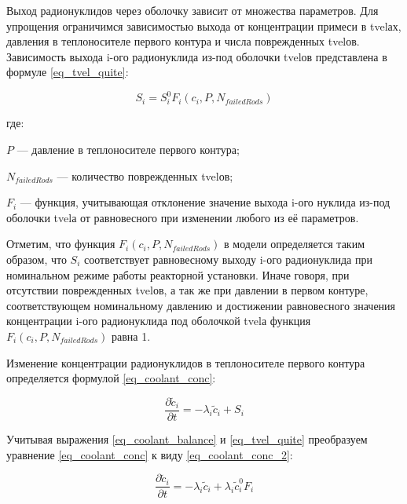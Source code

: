 Выход радионуклидов через оболочку зависит от множества параметров. Для упрощения ограничимся зависимостью выхода от 
концентрации примеси в \ac{tvel}ах, давления в теплоносителе первого контура и числа поврежден­ных \ac{tvel}ов. 
Зависимость выхода i-ого радионуклида из-под оболочки \ac{tvel}ов представлена в формуле \ref{eq_tvel_quite}:

\begin{equation}
    \label{eq_tvel_quite}
    S_{i} = S_{i}^{0}F_{i}(c_{i}, P, N_{failedRods})
\end{equation}

где:
\begin{description}
    \item $P$ --- давление в теплоносителе первого контура;
    \item $N_{failedRods}$ --- количество поврежденных \ac{tvel}ов;
    \item $F_{i}$ --- функция, учитывающая отклонение значение выхода i-ого нуклида из-под оболочки \ac{tvel}а от 
        равновесного при изменении любого из её параметров.
\end{description}

Отметим, что функция $F_{i}(c_{i}, P, N_{failedRods})$ в модели определяется таким образом, что $S_{i}$ соответствует 
равновесному выходу i-ого радионуклида при номинальном режиме работы реакторной установки. Иначе говоря, при отсутствии 
поврежденных \ac{tvel}ов, а так же при давлении в первом контуре, соответствующем номинальному давлению и достижении 
равновесного значения концентрации i-ого радионуклида под оболочкой \ac{tvel}а функция $F_{i}(c_{i}, P, N_{failedRods})$ 
равна 1.

Изменение концентрации радионуклидов в теплоносителе первого контура определяется формулой \ref{eq_coolant_conc}:

\begin{equation}
    \label{eq_coolant_conc}
    \frac{\partial \widetilde{c}_{i}}{\partial t} = -\lambda_{i}\widetilde{c}_{i} + S_{i}
\end{equation}

Учитывая выражения \ref{eq_coolant_balance} и \ref{eq_tvel_quite} преобразуем уравнение \ref{eq_coolant_conc} к виду 
\ref{eq_coolant_conc_2}:

\begin{equation}
    \label{eq_coolant_conc_2}
    \frac{\partial \widetilde{c}_{i}}{\partial t} = -\lambda_{i}\widetilde{c}_{i} + \lambda_{i}\widetilde{c}_{i}^{0}F_{i}
\end{equation}

